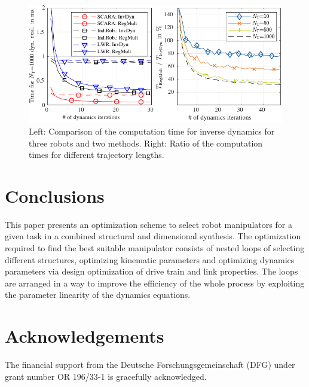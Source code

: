 \documentclass{svproc}
\begin{document}
\begin{figure}[tb]
    \includegraphics{./figures/dyn_timing_eval.pdf}
    \caption{Left: Comparison of the computation time for inverse dynamics for three robots and two methods. Right: Ratio of the computation times for different trajectory lengths.}
    \label{fig:timing_evaluation}
\end{figure} 


\section{Conclusions}
\label{sec:Conclusion}



This paper presents an optimization scheme to select robot manipulators for a given task in a combined structural and dimensional synthesis.
The optimization required to find the best suitable manipulator consists of nested loops of selecting different structures, optimizing kinematic parameters and optimizing dynamics parameters via design optimization of drive train and link properties.
The loops are arranged in a way to improve the efficiency of the whole process by exploiting the parameter linearity of the dynamics equations.

\newpage
\section*{Acknowledgements}

The financial support from the Deutsche Forschungsgemeinschaft (DFG) under grant number OR 196/33-1 is gracefully acknowledged.



\end{document}
